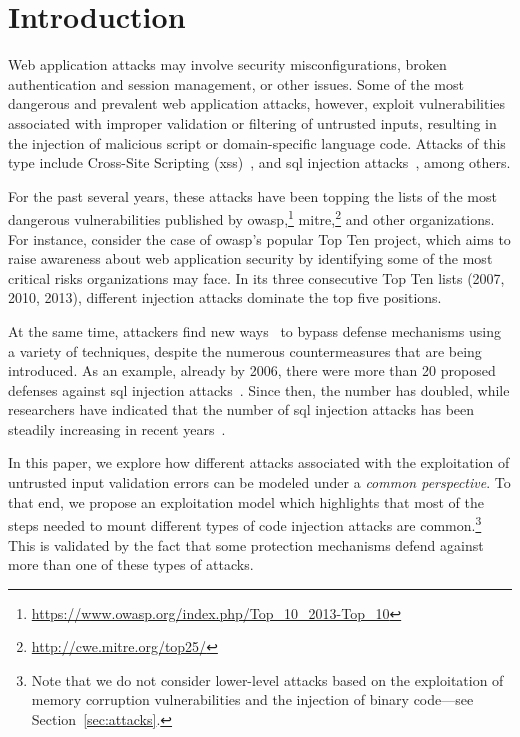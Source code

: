 \documentclass[10pt,journal,compsoc]{IEEEtran}
\begin{document}
\maketitle

\IEEEdisplaynontitleabstractindextext

\IEEEpeerreviewmaketitle

\section{Introduction}

Web application attacks may involve security misconfigurations, broken
authentication and session management, or other issues. Some of the
most dangerous and prevalent web application attacks, however,
exploit vulnerabilities associated with improper validation or filtering
of untrusted inputs, resulting in the injection of malicious
script or domain-specific language code.
Attacks of this type include Cross-Site Scripting ({\sc xss})~\cite{SW06},
and {\sc sql} injection attacks~\cite{RL12b},
among others.

For the past several years,
these attacks have been topping the lists of the most dangerous vulnerabilities
published by
{\sc owasp},\footnote{\scriptsize\url{https://www.owasp.org/index.php/Top_10_2013-Top_10}}
{\sc mitre},\footnote{\scriptsize\url{http://cwe.mitre.org/top25/}}
and other organizations.
For instance, consider the case of {\sc owasp}'s popular Top Ten
project,%
which aims to raise awareness about web application security by
identifying some of the most critical risks organizations may face.
In its three consecutive Top Ten lists (2007, 2010, 2013), different
injection attacks dominate the top five positions.

At the same time, attackers find new ways~\cite{HNSHS12,DKH14}
to bypass defense mechanisms using a variety of techniques,
despite the numerous countermeasures that are being introduced.
As an example, already by 2006,
there were more than 20 proposed defenses
against {\sc sql} injection attacks~\cite{HVO06}.
Since then, the number has doubled, while researchers have indicated that
the number of {\sc sql} injection attacks has been steadily
increasing in recent years~\cite{SSL12}.

In this paper, we explore how different attacks associated with 
the exploitation of untrusted input validation errors can be modeled 
under a {\it common perspective}. To that end, we propose an exploitation
model which highlights that most of the steps needed to mount
different types of code injection attacks are
common.\footnote{\scriptsize Note that we do not consider lower-level attacks based on
the exploitation of memory corruption vulnerabilities and the injection
of binary code---see Section~\ref{sec:attacks}.} This is validated by the fact that
some protection mechanisms defend against more than one of these
types of attacks.
\end{document}
